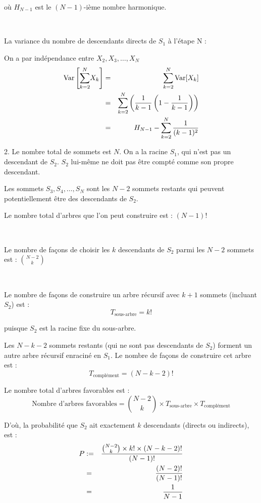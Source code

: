 o{\`u} $H_{N - 1}$ est le $(N - 1)$-i{\`e}me nombre harmonique.

\

La variance du nombre de descendants directs de $S_1$ {\`a} l'{\'e}tape N :

On a par ind{\'e}pendance entre $X_2, X_3, \ldots, X_N$
\begin{eqnarray*}
  \operatorname{Var} \left[ \underset{k = 2}{\overset{N}{\sum}} X_k \right] & = &
  \sum_{k = 2}^N \text{Var} [X_k]\\
  & = &  \sum_{k = 2}^N \left( \frac{1}{k - 1}  \left( 1 - \frac{1}{k - 1}
  \right) \right)\\
  & = & H_{N - 1} - \sum_{k = 2}^N \frac{1}{(k - 1)^2}
\end{eqnarray*}


2. Le nombre total de sommets est $N$. On a la racine $S_1$, qui n'est pas un
descendant de $S_2$. $S_2$ lui-m{\^e}me ne doit pas {\^e}tre compt{\'e} comme
son propre descendant.

Les sommets $S_3, S_4, \ldots, S_N$ sont les $N - 2$ sommets restants qui
peuvent potentiellement {\^e}tre des descendants de $S_2$.

Le nombre total d'arbres que l'on peut construire est : $(N - 1) !$

\

Le nombre de fa{\c c}ons de choisir les $k$ descendants de $S_2$ parmi les $N
- 2$ sommets est : $\binom{N - 2}{k}$

\

Le nombre de fa{\c c}ons de construire un arbre r{\'e}cursif avec $k + 1$
sommets (incluant $S_2$) est :
\[ T_{\text{sous-arbre}} = k! \]


puisque $S_2$ est la racine fixe du sous-arbre.

Les $N - k - 2$ sommets restants (qui ne sont pas descendants de $S_2$)
forment un autre arbre r{\'e}cursif enracin{\'e} en $S_1$. Le nombre de fa{\c
c}ons de construire cet arbre est :
\[ T_{\text{compl{\'e}ment}} = (N - k - 2) ! \]


Le nombre total d'arbres favorables est :
\[ \text{Nombre d'arbres favorables} = \binom{N - 2}{k} \times
   T_{\text{sous-arbre}} \times T_{\text{compl{\'e}ment}} \]


D'o{\`u}, la probabilit{\'e} que $S_2$ ait exactement $k$ descendants (directs
ou indirects), est :
\begin{eqnarray*}
  P & := & \frac{\binom{N - 2}{k} \times k! \times (N - k - 2) !}{(N - 1)
  !}\\
  & = & \frac{(N - 2) !}{(N - 1) !}\\
  & = & \frac{1}{N - 1}
\end{eqnarray*}


